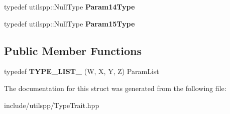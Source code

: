 \begin{DoxyCompactItemize}
\item 
\hypertarget{structutilspp_1_1PointerOnFunction_3_01V_07_5_08_07W_00_01X_00_01Y_00_01Z_08_4_ac081ceacd33dfed2dce68752c929fa7f}{typedef utilspp\-::\-Null\-Type {\bfseries Param14\-Type}}\label{structutilspp_1_1PointerOnFunction_3_01V_07_5_08_07W_00_01X_00_01Y_00_01Z_08_4_ac081ceacd33dfed2dce68752c929fa7f}

\item 
\hypertarget{structutilspp_1_1PointerOnFunction_3_01V_07_5_08_07W_00_01X_00_01Y_00_01Z_08_4_a55aeb9b777b337c204d14d0b23d828e3}{typedef utilspp\-::\-Null\-Type {\bfseries Param15\-Type}}\label{structutilspp_1_1PointerOnFunction_3_01V_07_5_08_07W_00_01X_00_01Y_00_01Z_08_4_a55aeb9b777b337c204d14d0b23d828e3}

\end{DoxyCompactItemize}
\subsection*{Public Member Functions}
\begin{DoxyCompactItemize}
\item 
\hypertarget{structutilspp_1_1PointerOnFunction_3_01V_07_5_08_07W_00_01X_00_01Y_00_01Z_08_4_ad5cb0dfd12640f14140ed516704ed862}{typedef {\bfseries T\-Y\-P\-E\-\_\-\-L\-I\-S\-T\-\_} (W, X, Y, Z) Param\-List}\label{structutilspp_1_1PointerOnFunction_3_01V_07_5_08_07W_00_01X_00_01Y_00_01Z_08_4_ad5cb0dfd12640f14140ed516704ed862}

\end{DoxyCompactItemize}


The documentation for this struct was generated from the following file\-:\begin{DoxyCompactItemize}
\item 
include/utilspp/Type\-Trait.\-hpp\end{DoxyCompactItemize}
